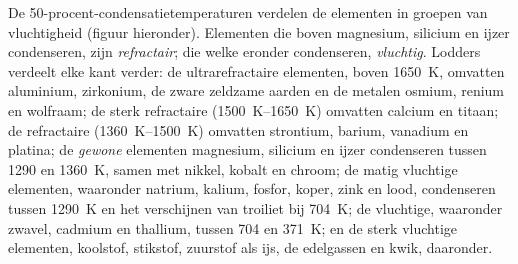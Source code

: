 De 50-procent-condensatietemperaturen verdelen de elementen in groepen van
vluchtigheid (figuur hieronder). Elementen die boven magnesium, silicium en
ijzer condenseren, zijn \emph{refractair}; die welke eronder condenseren, \emph{vluchtig}.
Lodders verdeelt elke kant verder: de ultrarefractaire elementen, boven
\qty{1650}{K}, omvatten aluminium, zirkonium, de zware zeldzame aarden en de
metalen osmium, renium en wolfraam; de sterk refractaire
(\qtyrange{1500}{1650}{K}) omvatten calcium en titaan; de refractaire
(\qtyrange{1360}{1500}{K}) omvatten strontium, barium, vanadium en platina; de
\emph{gewone}
elementen magnesium, silicium en ijzer condenseren tussen \num{1290} en
\qty{1360}{K}, samen met nikkel, kobalt en chroom; de matig
vluchtige elementen, waaronder natrium, kalium, fosfor, koper, zink en
lood, condenseren tussen \qty{1290}{K} en het verschijnen van troiliet bij
\qty{704}{K}; de vluchtige, waaronder zwavel, cadmium en thallium,
tussen \num{704} en \qty{371}{K}; en de sterk vluchtige elementen, koolstof,
stikstof, zuurstof als ijs, de edelgassen en kwik, daaronder.

